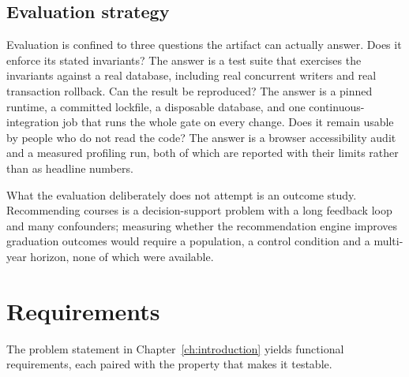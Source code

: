 \subsection{Evaluation strategy}

Evaluation is confined to three questions the artifact can actually answer. Does it enforce its
stated invariants? The answer is a test suite that exercises the invariants against a real database,
including real concurrent writers and real transaction rollback. Can the result be reproduced? The
answer is a pinned runtime, a committed lockfile, a disposable database, and one continuous-
integration job that runs the whole gate on every change. Does it remain usable by people who do not
read the code? The answer is a browser accessibility audit and a measured profiling run, both of
which are reported with their limits rather than as headline numbers.

What the evaluation deliberately does not attempt is an outcome study. Recommending courses is a
decision-support problem with a long feedback loop and many confounders; measuring whether the
recommendation engine improves graduation outcomes would require a population, a control condition
and a multi-year horizon, none of which were available.

\section{Requirements}

The problem statement in Chapter~\ref{ch:introduction} yields functional requirements, each paired
with the property that makes it testable.


